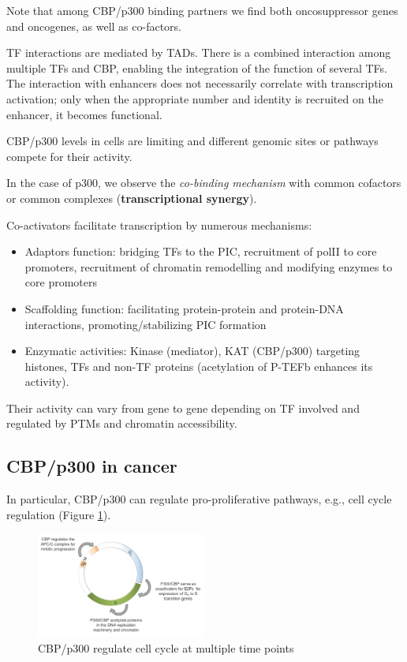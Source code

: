 Note that among CBP/p300 binding partners we find both oncosuppressor genes and oncogenes, as well as co-factors.

TF interactions are mediated by TADs. There is a combined interaction among multiple TFs and CBP, enabling the integration of the function of several TFs. The interaction with enhancers does not necessarily correlate with transcription activation; only when the appropriate number and identity is recruited on the enhancer, it becomes functional.

CBP/p300 levels in cells are limiting and different genomic sites or pathways compete for their activity.

In the case of p300, we observe the \emph{co-binding mechanism} with common cofactors or common complexes (\textbf{transcriptional synergy}).

Co-activators facilitate transcription by numerous mechanisms:

\begin{itemize}
\tightlist
\item
  Adaptors function: bridging TFs to the PIC, recruitment of polII to core promoters, recruitment of chromatin remodelling and modifying enzymes to core promoters
\item
  Scaffolding function: facilitating protein-protein and protein-DNA interactions, promoting/stabilizing PIC formation
\item
  Enzymatic activities: Kinase (mediator), KAT (CBP/p300) targeting histones, TFs and non-TF proteins (acetylation of P-TEFb enhances its activity).
\end{itemize}

Their activity can vary from gene to gene depending on TF involved and regulated by PTMs and chromatin accessibility.

\hypertarget{crepp300-in-cancer}{%
\subsection{CBP/p300 in cancer}\label{crepp300-in-cancer}}

In particular, CBP/p300 can regulate pro-proliferative pathways, e.g., cell cycle regulation (Figure \ref{fig:cycle}).

\begin{figure}
\centering
\includegraphics[width=0.5\textwidth]{../_resources/Screenshot_2022-10-12_at_09-01-27.png}
\caption{CBP/p300 regulate cell cycle at multiple time points}
\label{fig:cycle}
\end{figure}

